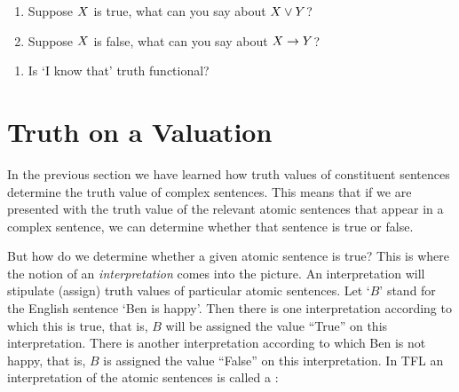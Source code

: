 \begin{practiceproblems}
	
	
	\problempart 
\begin{enumerate}
	\item Suppose $X$ is true, what can you say about $X\vee Y$?
\item Suppose $X$ is false, what can you say about $X\rightarrow Y$?
\end{enumerate}


\problempart
\begin{enumerate}
	\item 	Is `I know that' truth functional? \\
\end{enumerate}
\end{practiceproblems}



\chapter{Truth on a Valuation}
In the previous section we have learned how truth values of constituent sentences determine the truth value of complex sentences. This means that if we are presented with the truth value of the relevant atomic sentences that appear in a complex sentence, we can determine whether that sentence is true or false.

But how do we determine whether a given atomic sentence is true? This is where the notion of an \emph{interpretation} comes into the picture. An interpretation will stipulate (assign) truth values of particular atomic sentences. Let `$B$' stand for the English sentence `Ben is happy'. Then there is one interpretation according to which this is true, that is, $B$ will be assigned the value ``True'' on this interpretation. There is another interpretation according to which Ben is not happy, that is, $B$ is assigned the value ``False'' on this interpretation. In TFL an interpretation of the atomic sentences is called a :

